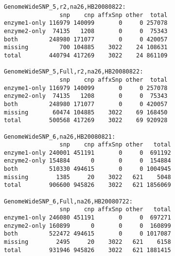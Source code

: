 \documentclass[11pt,a4paper]{article}
\begin{document}
\begin{Verbatim}[fontsize=\small]
GenomeWideSNP_5,r2,na26,HB20080822:
                snp    cnp affxSnp other  total
enzyme1-only 116979 140099       0     0 257078
enzyme2-only  74135   1208       0     0  75343
both         248980 171077       0     0 420057
missing         700 104885    3022    24 108631
total        440794 417269    3022    24 861109

GenomeWideSNP_5,Full,r2,na26,HB20080822:
                snp    cnp affxSnp other  total
enzyme1-only 116979 140099       0     0 257078
enzyme2-only  74135   1208       0     0  75343
both         248980 171077       0     0 420057
missing       60474 104885    3022    69 168450
total        500568 417269    3022    69 920928

GenomeWideSNP_6,na26,HB20080821:
                snp    cnp affxSnp other   total
enzyme1-only 240001 451191       0     0  691192
enzyme2-only 154884      0       0     0  154884
both         510330 494615       0     0 1004945
missing        1385     20    3022   621    5048
total        906600 945826    3022   621 1856069

GenomeWideSNP_6,Full,na26,HB20080722:
                snp    cnp affxSnp other   total
enzyme1-only 246080 451191       0     0  697271
enzyme2-only 160899      0       0     0  160899
both         522472 494615       0     0 1017087
missing        2495     20    3022   621    6158
total        931946 945826    3022   621 1881415
\end{Verbatim}
\end{document}
